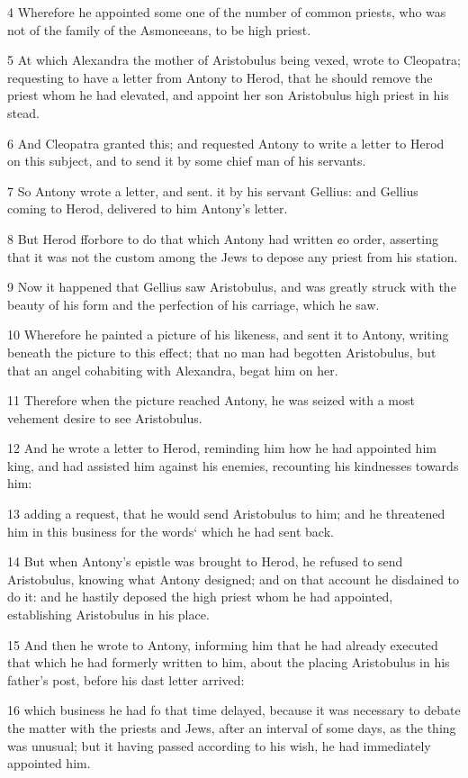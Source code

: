 4 Wherefore he appointed some one of the number of common priests, who was not of the family of the Asmoneeans, to be high priest.

5 At which Alexandra the mother of Aristobulus being vexed, wrote to Cleopatra; requesting to have a letter from Antony to Herod, that he should remove the priest whom he had elevated, and appoint her son Aristobulus high priest in his stead. 

6 And Cleopatra granted this; and requested Antony to write a letter to Herod on this subject, and to send it by some chief man of his servants. 

7 So Antony wrote a letter, and sent. it by his servant Gellius: and Gellius coming to Herod, delivered to him Antony’s letter. 

8 But Herod fforbore to do that which Antony had written ¢o order, asserting that it was not the custom among the Jews to depose any priest from his station. 

9 Now it happened that Gellius saw Aristobulus, and was greatly struck with the beauty of his form and the perfection of his carriage, which he saw. 

10 Wherefore he painted a picture of his likeness, and sent it to Antony, writing beneath the picture to this effect; that no man had begotten Aristobulus, but that an angel cohabiting with Alexandra, begat him on her. 

11 Therefore when the picture reached Antony, he was seized with a most vehement desire to see Aristobulus. 

12 And he wrote a letter to Herod, reminding him how he had appointed him king, and had assisted him against his enemies, recounting his kindnesses towards him: 

13 adding a request, that he would send Aristobulus to him; and he threatened him in this business for the words‘ which he had sent back. 

14 But when Antony’s epistle was brought to Herod, he refused to send Aristobulus, knowing what Antony designed; and on that account he disdained to do it: and he hastily deposed the high priest whom he had appointed, establishing Aristobulus in his place. 

15 And then he wrote to Antony, informing him that he had already executed that which he had formerly written to him, about the placing Aristobulus in his father’s post, before his dast letter arrived: 

16 which business he had fo that time delayed, because it was necessary to debate the matter with the priests and Jews, after an interval of some days, as the thing was unusual; but it having passed according to his wish, he had immediately appointed him. 

